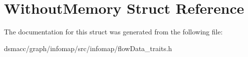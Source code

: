 \hypertarget{structWithoutMemory}{}\section{Without\+Memory Struct Reference}
\label{structWithoutMemory}


The documentation for this struct was generated from the following file\+:\begin{DoxyCompactItemize}
\item 
dsmacc/graph/infomap/src/infomap/flow\+Data\+\_\+traits.\+h\end{DoxyCompactItemize}

